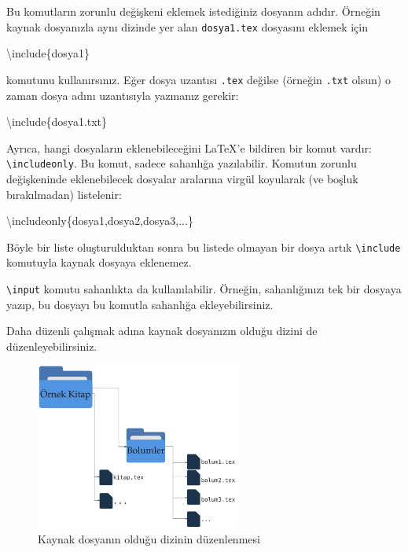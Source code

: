 \documentclass[
  letterpaper,
  DIV=11,
  numbers=noendperiod]{scrreprt}
\newenvironment{Shaded}{\begin{snugshade}}{\end{snugshade}}
\newcommand{\BuiltInTok}[1]{\textcolor[rgb]{0.00,0.23,0.31}{#1}}
\newcommand{\ExtensionTok}[1]{\textcolor[rgb]{0.00,0.23,0.31}{#1}}
\newcommand{\FunctionTok}[1]{\textcolor[rgb]{0.28,0.35,0.67}{#1}}
\newcommand{\NormalTok}[1]{\textcolor[rgb]{0.00,0.23,0.31}{#1}}
\begin{document}
Bu komutların zorunlu değişkeni eklemek istediğiniz dosyanın adıdır.
Örneğin kaynak dosyanızla aynı dizinde yer alan \texttt{dosya1.tex}
dosyasını eklemek için

\begin{Shaded}
\begin{Highlighting}[]
\BuiltInTok{\textbackslash{}include}\NormalTok{\{}\ExtensionTok{dosya1}\NormalTok{\}}
\end{Highlighting}
\end{Shaded}

komutunu kullanırsınız. Eğer dosya uzantısı \texttt{.tex} değilse
(örneğin \texttt{.txt} olsun) o zaman dosya adını uzantısıyla yazmanız
gerekir:

\begin{Shaded}
\begin{Highlighting}[]
\BuiltInTok{\textbackslash{}include}\NormalTok{\{}\ExtensionTok{dosya1.txt}\NormalTok{\}}
\end{Highlighting}
\end{Shaded}

Ayrıca, hangi dosyaların eklenebileceğini {\LaTeX}'e bildiren bir komut
vardır: \texttt{\textbackslash{}includeonly}. Bu komut, sadece sahanlığa
yazılabilir. Komutun zorunlu değişkeninde eklenebilecek dosyalar
aralarına virgül koyularak (ve boşluk bırakılmadan) listelenir:

\begin{Shaded}
\begin{Highlighting}[]
\FunctionTok{\textbackslash{}includeonly}\NormalTok{\{dosya1,dosya2,dosya3,...\}}
\end{Highlighting}
\end{Shaded}

Böyle bir liste oluşturulduktan sonra bu listede olmayan bir dosya artık
\texttt{\textbackslash{}include} komutuyla kaynak dosyaya eklenemez.

\texttt{\textbackslash{}input} komutu sahanlıkta da kullanılabilir.
Örneğin, sahanlığınızı tek bir dosyaya yazıp, bu dosyayı bu komutla
sahanlığa ekleyebilirsiniz.

Daha düzenli çalışmak adına kaynak dosyanızın olduğu dizini de
düzenleyebilirsiniz.

\begin{figure}

{\centering \includegraphics[width=0.6\textwidth,height=\textheight]{./images/dizin.png}

}

\caption{\label{fig-dizin}Kaynak dosyanın olduğu dizinin düzenlenmesi}

\end{figure}
\end{document}
